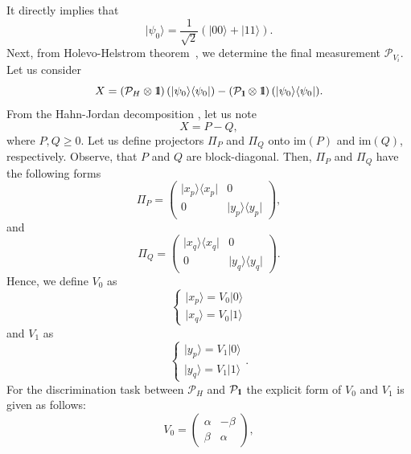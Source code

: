 \documentclass[preprint,12pt, a4paper, dvipsnames]{elsarticle}
\newcommand{\ket}[1]{\ensuremath{|#1\rangle}}
\newcommand{\bra}[1]{\ensuremath{\langle#1|}}
\newcommand{\ketbra}[2]{\ensuremath{\ket{#1}\bra{#2}}}
\newcommand{\proj}[1]{\ensuremath{\ketbra{#1}{#1}}}
\newcommand{\1}{{\rm 1\hspace{-0.9mm}l}}
\newcommand{\Id}{{\rm 1\hspace{-0.9mm}l}}
\newcommand{\PP}{\mathcal{P}}
\theoremstyle{definition}
\begin{document}
 It directly implies that
 \begin{equation}
 \ket{\psi_0} = \frac{1}{\sqrt{2}}(\ket{00} + \ket{11}).  \end{equation}
 Next, from Holevo-Helstrom theorem~\cite{watrous}, we determine the final measurement $\PP_{V_i}$.
 Let us consider \begin{equation}
 X = \left(\PP_{H} \otimes \Id \right)(\proj{\psi_0}) - \left(\PP_{\Id} \otimes \Id \right) (\proj{\psi_0}).
  \end{equation}
 From the Hahn-Jordan decomposition \cite{watrous}, let us note
 \begin{equation}
 X = P - Q,
 \end{equation}
 where $P, Q \ge 0 $.
 Let us define projectors $\Pi_P$ and $\Pi_Q$ onto  $\text{im}(P)$ and $\text{im}(Q)$,
 respectively. Observe, that $P $ and $Q$ are block-diagonal.  Then,  $\Pi_P$ and $\Pi_Q$ have the following forms
 \begin{equation}
 \Pi_P = \left(\begin{array}{cc}\proj{x_p}&0\\0&\proj{y_p}\end{array}\right),
 \end{equation}
 and
 \begin{equation}
 \Pi_Q = \left(\begin{array}{cc}\proj{x_q}&0\\0&\proj{y_q}\end{array}\right).
 \end{equation}
 Hence, we define $V_0$ as
 \begin{equation}
 \begin{cases} \ket{x_p} =  V_0  \ket{0} \\  \ket{x_q} =  V_0 \ket{1} \end{cases}
 \end{equation}
 and $V_1$ as
 \begin{equation}
 \begin{cases}
 \ket{y_p} =   V_1 \ket{0} \\
  \ket{y_q} = V_1  \ket{1}
 \end{cases}.
 \end{equation}
 For the discrimination task between $\PP_{H}$ and $\PP_{\Id}$ the explicit form of $V_0$ and $V_1$ is given as
 follows: 
 \begin{equation}
 V_0 =
 \left(\begin{array}{cc} \alpha & -\beta\\ \beta & \alpha \end{array}\right),
 \end{equation}
\end{document}
